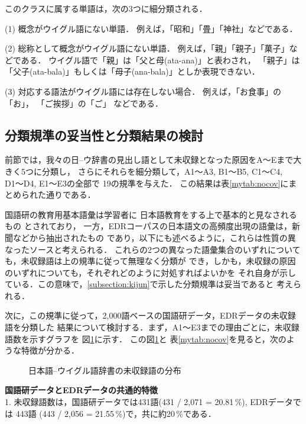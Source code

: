 {このクラスに属する単語は，次の3つに細分類される．

(1) 概念がウイグル語にない単語． 例えば，「昭和」「畳」「神社」などである．

(2) 総称として概念がウイグル語にない単語． 例えば，「親」「親子」「菓子」などである．
ウイグル語で「親」は「父と母(ata-ana)」と表わされ，
「親子」は「父子(ata-bala)」もしくは「母子(ana-bala)」としか表現できない．

(3) 対応する語法がウイグル語には存在しない場合． 例えば，「お食事」の
    「お」，
「ご挨拶」の「ご」
などである．

\subsection{分類規準の妥当性と分類結果の検討}\label{subsection:kento}
前節では，我々の日--ウ辞書の見出し語として未収録となった原因をA〜Eまで大きく5つに分類し，
さらにそれらを細分類して，A1〜A3, B1〜B5, C1〜C4, D1〜D4, E1〜E3の全部で
19の規準を与えた．
この結果は表\ref{mytab:nocov}にまとめられた通りである．

国語研の教育用基本語彙は学習者に
日本語教育をする上で基本的と見なされるもの
とされており，
一方，EDRコーパスの日本語文の高頻度出現の語彙は，新聞などから抽出されたもの
であり，以下にも述べるように，これらは性質の異なったソースと考えられる．
これらの2つの異なった語彙集合のいずれについても，未収録語は上の規準に従って無理なく分類が
でき，しかも，未収録の原因のいずれについても，それぞれどのように対処すればよいかを
それ自身が示している．この意味で，\ref{subsection:kijun}で示した分類規準は妥当であると
考えられる．

次に，この規準に従って，2,000語ベースの国語研データ，EDRデータの未収録語を分類した
結果について検討する．まず，A1〜E3までの理由ごとに，未収録語数を示すグラフを
図\ref{myfig:uncover}に示す．
この図\ref{myfig:uncover}と
表\ref{mytab:nocov}を見ると，次のような特徴が分かる．\\ \mbox{}
\begin{figure}[tbp]
\begin{center}
\caption{日本語--ウイグル語辞書の未収録語の分布}\label{myfig:uncover} 
\mbox{}
\end{center}
\end{figure}

\noindent
{\bf 国語研データとEDRデータの共通的特徴} \\

1. 未収録語数は，国語研データでは431語(431 / 2,071 = 20.81\,\%), EDRデータでは 443語
(443 / 2,056 = 21.55\,\%)で，共に約20\,\%である．


}
